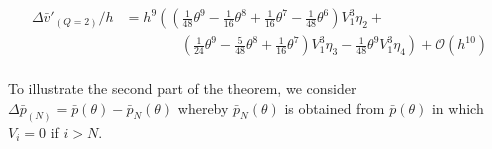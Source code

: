 \begin{align*}
    \Delta \bar{v}'_{(Q=2)}/h & = h^{9}\left(\left(\frac{1}{48} \theta^{9} - \frac{1}{16} \theta^{8} + \frac{1}{16} \theta^{7} - \frac{1}{48} \theta^{6}\right) V_{1}^{3} \eta_{2} + \right.                                                                             \\
                              & \qquad\qquad \left. \left(\frac{1}{24} \theta^{9} - \frac{5}{48} \theta^{8} + \frac{1}{16} \theta^{7}\right) V_{1}^{3} \eta_{3} -\frac{1}{48} \theta^{9} V_{1}^{3} \eta_{4}\right) + \mathcal{O}(h^{10})                                 \\
\end{align*}

To illustrate the second part of the theorem, we consider $\Delta \bar{p}_{(N)} = \bar{p}(\theta) - \bar{p}_N(\theta)$  whereby $\bar{p}_N(\theta)$ is obtained from
$\bar{p}(\theta)$ in which $V_i = 0$ if $i > N$.

